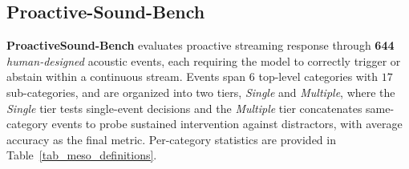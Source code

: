 \documentclass{article}
\begin{document}

\vspace{-1.5mm}
\subsection{Proactive-Sound-Bench}
\label{sec:proactive_bench}
 \vspace{-1.5mm}
\textbf{ProactiveSound-Bench} evaluates proactive streaming response through \textbf{644} \textit{human-designed} acoustic events, each requiring the model to correctly trigger or abstain within a continuous stream. Events span 6 top-level categories with $17$ sub-categories, and are organized into two tiers, \emph{Single} and \emph{Multiple}, where the \emph{Single} tier tests single-event decisions and the \emph{Multiple} tier concatenates same-category events to probe sustained intervention against distractors, with average accuracy as the final metric. Per-category statistics are provided in Table~\ref{tab_meso_definitions}.

 
\end{document}
